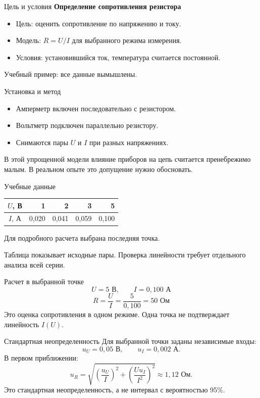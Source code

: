 \documentclass[14pt,aspectratio=169]{beamer}
\begin{document}
\begin{frame}{Цель и условия}
    \textbf{Определение сопротивления резистора}
    \begin{itemize}
        \item Цель: оценить сопротивление по напряжению и току.
        \item Модель: $R=U/I$ для выбранного режима измерения.
        \item Условия: установившийся ток, температура считается постоянной.
    \end{itemize}
    \alert{Учебный пример: все данные вымышлены.}
\end{frame}

\begin{frame}{Установка и метод}
    \begin{itemize}
        \item Амперметр включен последовательно с резистором.
        \item Вольтметр подключен параллельно резистору.
        \item Снимаются пары $U$ и $I$ при разных напряжениях.
    \end{itemize}
    В этой упрощенной модели влияние приборов на цепь считается
    пренебрежимо малым. В реальном опыте это допущение нужно обосновать.
\end{frame}

\begin{frame}{Учебные данные}
    \begin{center}
        \begin{tabular}{c|rrrr}
            $U$, В & 1 & 2 & 3 & 5 \\
            \hline
            $I$, А & 0,020 & 0,041 & 0,059 & 0,100
        \end{tabular}
    \end{center}
    Для подробного расчета выбрана последняя точка.

    Таблица показывает исходные пары. Проверка линейности
    требует отдельного анализа всей серии.
\end{frame}

\begin{frame}{Расчет в выбранной точке}
    \[
        U=5\text{ В},\qquad I=0{,}100\text{ А}
    \]
    \[
        R=\frac{U}{I}=\frac{5}{0{,}100}=50\text{ Ом}
    \]
    Это оценка сопротивления в одном режиме.
    Одна точка не подтверждает линейность $I(U)$.
\end{frame}

\begin{frame}{Стандартная неопределенность}
    Для выбранной точки заданы независимые входы:
    \[
        u_U=0{,}05\text{ В},\qquad u_I=0{,}002\text{ А}.
    \]
    В первом приближении:
    \[
        u_R=\sqrt{\left(\frac{u_U}{I}\right)^2+
        \left(\frac{Uu_I}{I^2}\right)^2}\approx1{,}12\text{ Ом}.
    \]
    Это стандартная неопределенность, а не интервал с вероятностью 95\%.
\end{frame}
\end{document}
